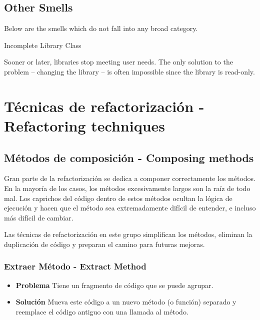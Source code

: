 \documentclass[11pt,a4paper,oneside]{book}
\begin{document}

\section{Other Smells}

Below are the smells which do not fall into any broad category.

Incomplete Library Class

Sooner or later, libraries stop meeting user needs. The only solution to the problem – changing the library – is often impossible since the library is read-only.



\chapter{Técnicas de refactorización - Refactoring techniques}

\section{Métodos de composición - Composing methods}

Gran parte de la refactorización se dedica a componer correctamente los métodos. En la mayoría de los casos, los métodos excesivamente largos son la raíz de todo mal. Los caprichos del código dentro de estos métodos ocultan la lógica de ejecución y hacen que el método sea extremadamente difícil de entender, e incluso más difícil de cambiar.

Las técnicas de refactorización en este grupo simplifican los métodos, eliminan la duplicación de código y preparan el camino para futuras mejoras.

\subsection{Extraer Método  - Extract Method}
\label{extractmethod}
\begin{itemize}
    \item \textbf{Problema} Tiene un fragmento de código que se puede agrupar.
    
    \item \textbf{Solución} Mueva este código a un nuevo método (o función) separado y reemplace el código antiguo con una llamada al método.
    
\end{itemize}
\end{document}
